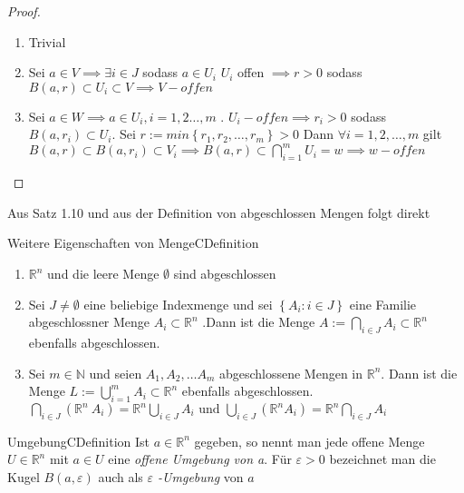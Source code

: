 \documentclass[a4paper]{memoir}
\begin{document}
 \begin{proof}
     \begin{enumerate}[label=\alph*)]
         \item Trivial
         \item Sei $ a \in V \implies \exists i \in J$ sodass $ a \in U_i$
            $ U_{i} $ offen $ \implies r>0 $ sodass $ B(a,r) \subset U_{i}
            \subset V \implies V-offen$ 
         \item Sei $ a \in W \implies a \in U_{i}, i = 1,2 \dots , m $ . $ 
             U_{i}-offen \implies r_{i}>0  $ sodass $ B(a,r_i) \subset U_{i}
            $. Sei $ r:= min\left\{ r_1,r_2,\dots, r_{m} \right\} > 0 $  
            Dann $ \forall i = 1,2, \dots , m $ gilt $ B(a,r) \subset 
            B(a,r_i) \subset V_{i} \implies B(a,r) \subset 
            \bigcap\limits_{i=1}^{m} U_{i} = w \implies w-offen  $ 
     \end{enumerate}
 \end{proof}
 Aus Satz 1.10 und aus der Definition von abgeschlossen Mengen folgt direkt
 \begin{ibox}{Weitere Eigenschaften von Menge}{CDefinition}
     \begin{enumerate}[label=\alph*)]
         \item $ \mathbb{R}^n $ und die leere Menge $ \emptyset $ sind 
             abgeschlossen
         \item Sei $ J \neq \emptyset $ eine beliebige Indexmenge und sei 
             $ \left\{ A_{i} : i \in J \right\}  $ eine Familie
             abgeschlossner Menge $ A_{i} \subset \mathbb{R}^n $ .Dann ist
             die Menge $ A := \bigcap\limits_{i \in J}^{} A_{i} \subset 
             \mathbb{R}^n$ ebenfalls abgeschlossen.
         \item Sei $ m \in \mathbb{N}  $ und seien $ A_1, A_2, \dots A_{m}$
             abgeschlossene Mengen in $ \mathbb{R}^n $. Dann ist die Menge 
             $ L:= \bigcup\limits_{i=1}^{m} A_{i} \subset \mathbb{R}^n  $ 
             ebenfalls abgeschlossen. $ \bigcap\limits_{i \in J }^{}  \left( \mathbb{R}^n \ A_{i} \right) = \mathbb{R}^n
             \bigcup\limits_{i \in J}^{} A_{i} \text{ und } \bigcup\limits_{i \in J}^{} \left( \mathbb{R}^n A_{i} \right) = \mathbb{R}^n
             \bigcap\limits_{i \in J}^{} A_{i} $ 
     \end{enumerate}
 \end{ibox}
 
\begin{ibox}{Umgebung}{CDefinition}
    Ist $ a \in \mathbb{R}^n $ gegeben, so nennt man jede offene Menge $ U \in \mathbb{R}^n $ mit $ a \in U $ eine 
    \textit{offene Umgebung von a}. Für $ \varepsilon > 0 $ bezeichnet man die Kugel $ B(a,\varepsilon) $ 
    auch als \textit{ $\varepsilon$ -Umgebung }von $ a $ 
\end{ibox}
\end{document}
